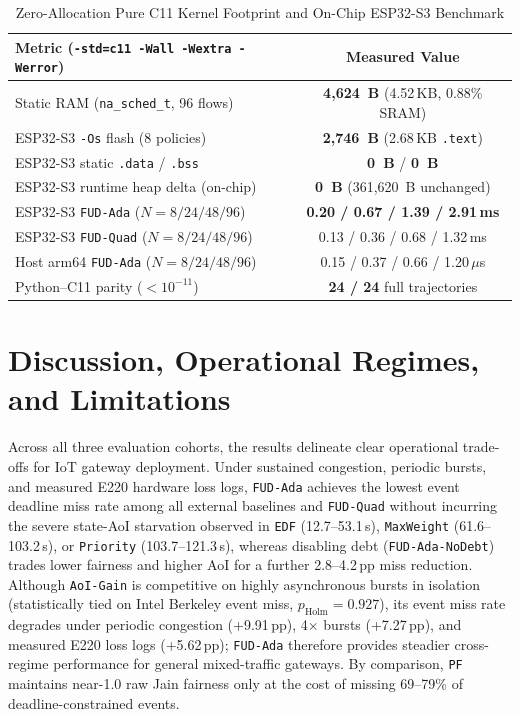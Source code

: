 \documentclass[journal]{IEEEtran}
\begin{document}
\begin{table}[!t]
\centering
\caption{Zero-Allocation Pure C11 Kernel Footprint and On-Chip ESP32-S3 Benchmark}
\label{tab:c11}
\scriptsize
\setlength{\tabcolsep}{1.0pt}
\begin{tabular}{@{}lc@{}}
\toprule
Metric (\texttt{-std=c11 -Wall -Wextra -Werror}) & Measured Value \\
\midrule
Static RAM (\texttt{na\_sched\_t}, 96 flows) & \textbf{4,624~B} (4.52\,KB, 0.88\% SRAM) \\
ESP32-S3 \texttt{-Os} flash (8 policies) & \textbf{2,746~B} (2.68\,KB \texttt{.text}) \\
ESP32-S3 static \texttt{.data} / \texttt{.bss} & \textbf{0~B} / \textbf{0~B} \\
ESP32-S3 runtime heap delta (on-chip) & \textbf{0~B} (361,620~B unchanged) \\
ESP32-S3 \texttt{FUD-Ada} ($N{=}8/24/48/96$) & \textbf{0.20 / 0.67 / 1.39 / 2.91\,ms} \\
ESP32-S3 \texttt{FUD-Quad} ($N{=}8/24/48/96$) & 0.13 / 0.36 / 0.68 / 1.32\,ms \\
Host arm64 \texttt{FUD-Ada} ($N{=}8/24/48/96$) & 0.15 / 0.37 / 0.66 / 1.20\,$\mu$s \\
Python--C11 parity ($<10^{-11}$) & \textbf{24 / 24} full trajectories \\
\bottomrule
\end{tabular}
\end{table}

\section{Discussion, Operational Regimes, and Limitations}

Across all three evaluation cohorts, the results delineate clear operational trade-offs for IoT gateway deployment. Under sustained congestion, periodic bursts, and measured E220 hardware loss logs, \texttt{FUD-Ada} achieves the lowest event deadline miss rate among all external baselines and \texttt{FUD-Quad} without incurring the severe state-AoI starvation observed in \texttt{EDF} (12.7--53.1\,s), \texttt{MaxWeight} (61.6--103.2\,s), or \texttt{Priority} (103.7--121.3\,s), whereas disabling debt (\texttt{FUD-Ada-NoDebt}) trades lower fairness and higher AoI for a further 2.8--4.2\,pp miss reduction. Although \texttt{AoI-Gain} is competitive on highly asynchronous bursts in isolation (statistically tied on Intel Berkeley event miss, $p_{\text{Holm}}{=}0.927$), its event miss rate degrades under periodic congestion (+9.91\,pp), 4$\times$ bursts (+7.27\,pp), and measured E220 loss logs (+5.62\,pp); \texttt{FUD-Ada} therefore provides steadier cross-regime performance for general mixed-traffic gateways. By comparison, \texttt{PF} maintains near-1.0 raw Jain fairness only at the cost of missing 69--79\% of deadline-constrained events.
\end{document}
